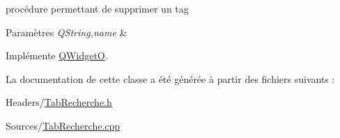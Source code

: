 procédure permettant de supprimer un tag 


\begin{DoxyParams}{Paramètres}
{\em Q\+String,name} & \\
\hline
\end{DoxyParams}


Implémente \hyperlink{class_q_widget_o_a917af7ef0578b09dc8d60f1101ea14a7}{Q\+WidgetO}.



La documentation de cette classe a été générée à partir des fichiers suivants \+:\begin{DoxyCompactItemize}
\item 
Headers/\hyperlink{_tab_recherche_8h}{Tab\+Recherche.\+h}\item 
Sources/\hyperlink{_tab_recherche_8cpp}{Tab\+Recherche.\+cpp}\end{DoxyCompactItemize}
